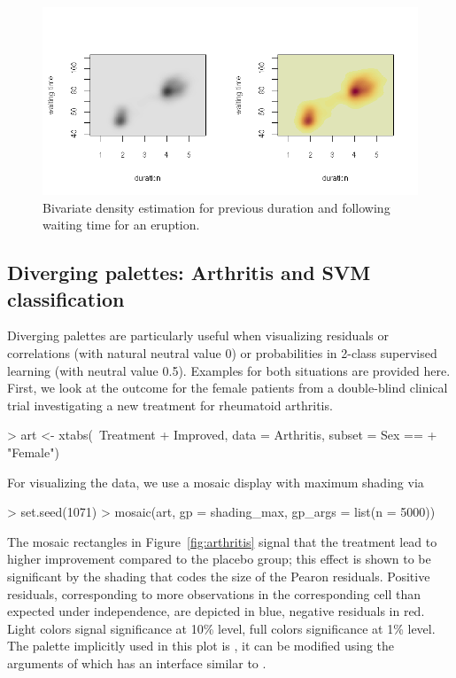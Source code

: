 \documentclass{Z}
\begin{document}
\begin{figure}[t!]
\begin{center}
\includegraphics{bkde2}
\caption{\label{fig:bkde2} Bivariate density estimation for previous duration and following waiting time for
an eruption.}
\end{center}
\end{figure}

\subsection{Diverging palettes: Arthritis and SVM classification}

Diverging palettes are particularly useful
when visualizing residuals or correlations (with natural neutral value 0) or probabilities 
in 2-class supervised learning (with neutral value 0.5). Examples for both situations are
provided here. First, we look at the outcome for the female patients from a double-blind clinical
trial investigating a new treatment for rheumatoid arthritis. 
\begin{Schunk}
\begin{Sinput}
> art <- xtabs(~Treatment + Improved, data = Arthritis, subset = Sex == 
+     "Female")
\end{Sinput}
\end{Schunk}
For visualizing the data, we use a mosaic display with maximum shading
\citep[as derived by][]{vcd:Zeileis+Meyer+Hornik:2005} via
\begin{Schunk}
\begin{Sinput}
> set.seed(1071)
> mosaic(art, gp = shading_max, gp_args = list(n = 5000))
\end{Sinput}
\end{Schunk}

The mosaic rectangles in Figure~\ref{fig:arthritis} 
signal that the treatment lead to higher improvement compared to the placebo group; this effect
is shown to be significant by the shading that codes the size of the Pearon residuals.
Positive residuals, corresponding
to more observations in the corresponding cell than expected under independence, are depicted
in blue, negative residuals in red. Light colors signal significance at 10\% level, full colors
significance at 1\% level. The palette implicitly used in this plot is
, it can be modified using
the arguments of  which has an interface similar to .
\end{document}
